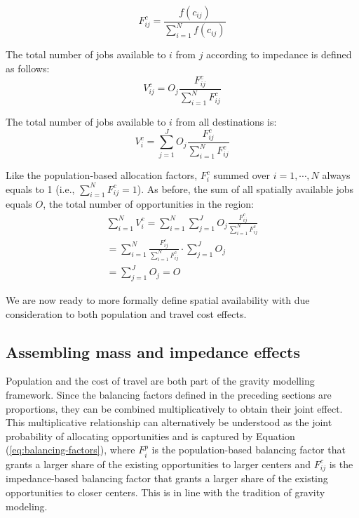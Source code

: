 \documentclass[10pt,letterpaper]{article}
\begin{document}
\begin{equation}
\label{eq:impedance-balancing-factor}
F^c_{ij} = \frac{f(c_{ij})}{\sum_{i=1}^N f(c_{ij})}
\end{equation}

The total number of jobs available to \(i\) from \(j\) according to
impedance is defined as follows: \[
V^c_{ij} = O_j\frac{F^c_{ij}}{\sum_{i=1}^N F^c_{ij}}
\]

The total number of jobs available to \(i\) from all destinations is: \[
V^c_{i} = \sum_{j=1}^J O_j\frac{F^c_{ij}}{\sum_{i=1}^N F^c_{ij}}
\]

Like the population-based allocation factors, \(F^c_{i}\) summed over
\(i=1,\cdots,N\) always equals to 1 (i.e.,
\(\sum_{i=1}^{N} F^c_{ij} = 1\)). As before, the sum of all spatially
available jobs equals \(O\), the total number of opportunities in the
region: \[
\begin{array}{l}
\sum_{i=1}^N V^c_i =\sum_{i=1}^N\sum_{j=1}^JO_j\frac{F^c_{ij}}{\sum_{i=1}^N F^c_{ij}}\\
=\sum_{i=1}^N \frac{F^c_{ij}}{\sum_{i=1}^N F^c_{ij}}\cdot\sum_{j=1}^JO_j\\
=\sum_{j=1}^J O_j = O
\end{array}
\]

We are now ready to more formally define spatial availability with due
consideration to both population and travel cost effects.

\hypertarget{assembling-mass-and-impedance-effects}{%
\subsection{Assembling mass and impedance
effects}\label{assembling-mass-and-impedance-effects}}

Population and the cost of travel are both part of the gravity modelling
framework. Since the balancing factors defined in the preceding sections
are proportions, they can be combined multiplicatively to obtain their
joint effect. This multiplicative relationship can alternatively be
understood as the joint probability of allocating opportunities and is
captured by Equation (\ref{eq:balancing-factors}), where \(F^p_{i}\) is
the population-based balancing factor that grants a larger share of the
existing opportunities to larger centers and \(F^c_{ij}\) is the
impedance-based balancing factor that grants a larger share of the
existing opportunities to closer centers. This is in line with the
tradition of gravity modeling.
\end{document}
